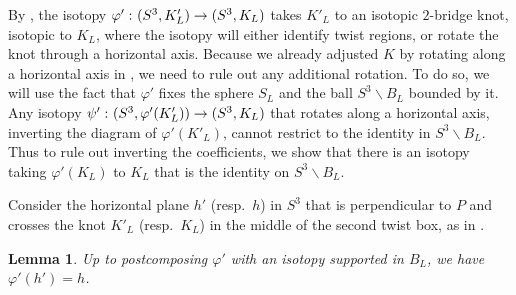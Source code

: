 \documentclass[12pt,reqno]{amsart}
\theoremstyle{plain}
\newtheorem{lemma}[theorem]{Lemma}
\theoremstyle{definition}
\def\from{\thinspace\colon}
\newcommand{\ssm}{\smallsetminus}
\begin{document}
By , the isotopy $\varphi'\from (S^3,K'_L)\to (S^3,K_L)$ 
takes $K'_L$ to an isotopic $2$-bridge knot, isotopic to $K_L$, where the isotopy 
will either identify twist regions, or rotate the knot through a horizontal axis.
Because we already adjusted $K$ by rotating along a horizontal axis in
, we need to rule out any additional rotation. 
To do so, we will use the fact that $\varphi'$ fixes the sphere $S_L$ and 
the ball $S^3 \ssm B_L$ bounded by it. Any isotopy $\psi'\from  (S^3, \varphi'(K'_L))\to
(S^3, K_L)$ that rotates along a horizontal axis, inverting the diagram of
$\varphi'(K'_L)$, cannot restrict to the identity in $S^3\ssm B_L$. Thus to rule 
out inverting the coefficients, we show that there is an isotopy taking 
$\varphi'(K_L)$ to $K_L$ that is the identity on $S^3\ssm B_L$.

Consider the horizontal plane $h'$ (resp.\ $h$) in $S^3$ that is perpendicular 
to $P$ and crosses the knot $K'_L$ (resp.\ $K_L$) in the middle of
the second twist box, as in .

\begin{lemma}\label{Lem:HorizontalBridgeSphere2Bridge}
Up to postcomposing $\varphi'$ with an isotopy supported in $B_L$, 
we have  $\varphi'(h')=h$.
\end{lemma}
\end{document}
